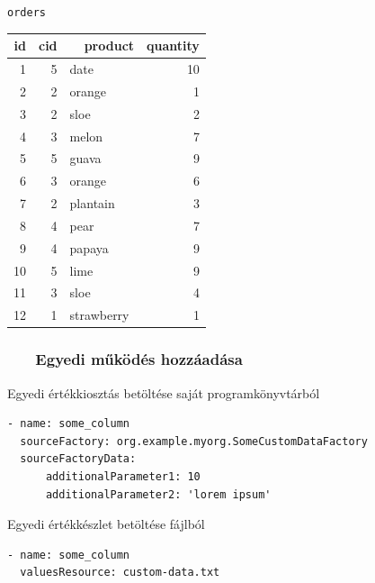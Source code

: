 \documentclass[
]{beamer}
\newcommand{\slidetitle}[2]{\frametitle{{\small #1 ~ \ding{226} ~ } \normalsize \textbf{#2} }}
\begin{document}
\begin{frame}[fragile]
\begin{minipage}[c]{0.45\textwidth}
        \vspace{0.5cm}
        
        \normalsize \texttt{orders}
        \vspace{0.1cm}
        
        \tiny
        \begin{tabular}{ |r|r|l|r| }
        \hline
            id & cid & ~~product & quantity \\
        \hline
            1 & 5 & date & 10 \\
            2 & 2 & orange & 1 \\
            3 & 2 & sloe & 2 \\
            4 & 3 & melon & 7 \\
            5 & 5 & guava & 9 \\
            6 & 3 & orange & 6 \\
            7 & 2 & plantain & 3 \\
            8 & 4 & pear & 7 \\
            9 & 4 & papaya & 9 \\
            10 & 5 & lime & 9 \\
            11 & 3 & sloe & 4 \\
            12 & 1 & strawberry & 1 \\
        \hline
        \end{tabular}
    \end{minipage}
\end{frame}

\begin{frame}[containsverbatim]
    \slidetitle{\sectionshorttitle}{Egyedi működés hozzáadása}
    
    {\color{beamer@blendedblue}Egyedi értékkiosztás betöltése saját programkönyvtárból}
    
    \vspace{0.5em}
    
    \begin{verbatim}
- name: some_column
  sourceFactory: org.example.myorg.SomeCustomDataFactory
  sourceFactoryData:
      additionalParameter1: 10
      additionalParameter2: 'lorem ipsum'
    \end{verbatim}
    
    \vspace{1em}
    
    {\color{beamer@blendedblue}Egyedi értékkészlet betöltése fájlból}
    
    \vspace{0.5em}
    
    \begin{verbatim}
- name: some_column
  valuesResource: custom-data.txt
    \end{verbatim}
    
\end{frame}
\end{document}
